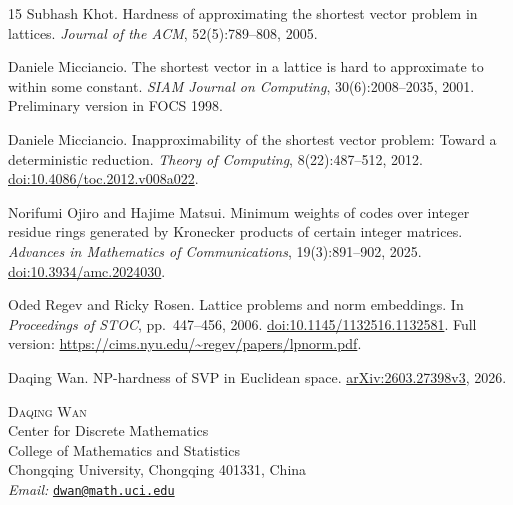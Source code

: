 \documentclass[11pt,letterpaper]{article}
\numberwithin{equation}{section}
\theoremstyle{definition}
\theoremstyle{remark}
\begin{document}
\begin{thebibliography}{15}
Subhash Khot.
Hardness of approximating the shortest vector problem in lattices.
\emph{Journal of the ACM}, 52(5):789--808, 2005.

Daniele Micciancio.
The shortest vector in a lattice is hard to approximate to within some constant.
\emph{SIAM Journal on Computing}, 30(6):2008--2035, 2001.
Preliminary version in FOCS 1998.

Daniele Micciancio.
Inapproximability of the shortest vector problem: Toward a deterministic reduction.
\emph{Theory of Computing}, 8(22):487--512, 2012.
\href{https://doi.org/10.4086/toc.2012.v008a022}{doi:10.4086/toc.2012.v008a022}.

Norifumi Ojiro and Hajime Matsui.
Minimum weights of codes over integer residue rings generated by Kronecker products of certain integer matrices.
\emph{Advances in Mathematics of Communications}, 19(3):891--902, 2025.
\href{https://doi.org/10.3934/amc.2024030}{doi:10.3934/amc.2024030}.

Oded Regev and Ricky Rosen.
Lattice problems and norm embeddings.
In \emph{Proceedings of STOC}, pp.~447--456, 2006.
\href{https://doi.org/10.1145/1132516.1132581}{doi:10.1145/1132516.1132581}.
Full version: \url{https://cims.nyu.edu/~regev/papers/lpnorm.pdf}.

Daqing Wan.
NP-hardness of SVP in Euclidean space.
\href{https://arxiv.org/abs/2603.27398v3}{arXiv:2603.27398v3}, 2026.
\end{thebibliography}

\bigskip
\begin{flushleft}
\small
\textsc{Daqing Wan}\\
Center for Discrete Mathematics\\
College of Mathematics and Statistics\\
Chongqing University, Chongqing 401331, China\\
\textit{Email:} \href{mailto:dwan@math.uci.edu}{\nolinkurl{dwan@math.uci.edu}}
\end{flushleft}
\end{document}
